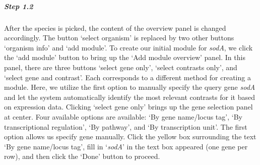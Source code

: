 \begin{small}
\subparagraph{Step 1.2}	After the species is picked, the content of the 
overview panel is changed accordingly. The button `select organism' is replaced
by two other buttons `organism info' and `add module'.
%
To create our initial module for \textit{sodA}, we click the `add module' button
to bring up the `Add module overview' panel.
%
In this panel, there are three buttons `select gene only', `select contrasts
only', and `select gene and contrast'.  Each corresponds to a different method
for creating a module.
%
Here, we utilize the first option to manually specify the query gene
\textit{sodA} and let the system automatically identify the most relevant
contrasts for it based on expression data.
%
Clicking `select gene only' brings up the gene selection panel at center.  Four
available options are available: `By gene name/locus tag', `By transcriptional
regulation', `By pathway', and `By transcription unit'.
%
The first option allows us specify gene manually.
Click the yellow box surrounding the text `By gene name/locus tag', fill in
`\textit{sodA}' in the text box appeared (one gene per row), and then click the
`Done' button to proceed. %


\end{small}
